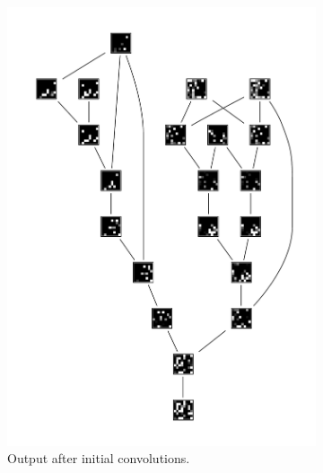 \documentclass[runningheads]{llncs}
\begin{document}
\begin{figure}
\begin{subfigure}{.3\textwidth}
		\includegraphics[width=\linewidth]{conv}
		\caption{Output after initial convolutions.}
	\end{subfigure}
	\begin{subfigure}{.3\textwidth}
		\centering

\end{subfigure}
\end{figure}
\end{document}
